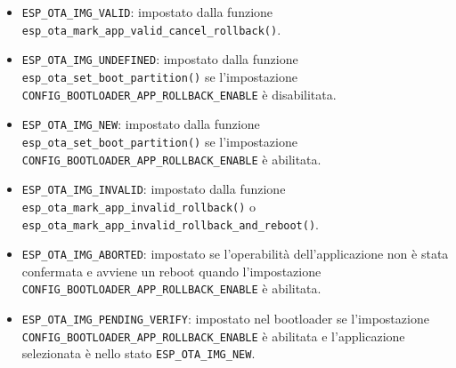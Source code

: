 \documentclass[a4paper]{article}
\begin{document}
\begin{itemize}
  \item \texttt{ESP\_OTA\_IMG\_VALID}: impostato dalla funzione \\
    \texttt{esp\_ota\_mark\_app\_valid\_cancel\_rollback()}.

  \item \texttt{ESP\_OTA\_IMG\_UNDEFINED}: impostato dalla funzione \\
    \texttt{esp\_ota\_set\_boot\_partition()} se l'impostazione \\
    \texttt{CONFIG\_BOOTLOADER\_APP\_ROLLBACK\_ENABLE} è disabilitata.

  \item \texttt{ESP\_OTA\_IMG\_NEW}: impostato dalla funzione \\
    \texttt{esp\_ota\_set\_boot\_partition()} se l'impostazione \\
    \texttt{CONFIG\_BOOTLOADER\_APP\_ROLLBACK\_ENABLE} è abilitata.

  \item \texttt{ESP\_OTA\_IMG\_INVALID}: impostato dalla funzione \\
    \texttt{esp\_ota\_mark\_app\_invalid\_rollback()} o \\
    \texttt{esp\_ota\_mark\_app\_invalid\_rollback\_and\_reboot()}.

  \item \texttt{ESP\_OTA\_IMG\_ABORTED}: impostato se l'operabilità dell'applicazione non
    è stata confermata e avviene un reboot quando l'impostazione \\
    \texttt{CONFIG\_BOOTLOADER\_APP\_ROLLBACK\_ENABLE} è abilitata.

  \item \texttt{ESP\_OTA\_IMG\_PENDING\_VERIFY}: impostato nel bootloader se l'impostazione \\
    \texttt{CONFIG\_BOOTLOADER\_APP\_ROLLBACK\_ENABLE} è abilitata e l'applicazione
    selezionata è nello stato \texttt{ESP\_OTA\_IMG\_NEW}.
\end{itemize}
\end{document}
